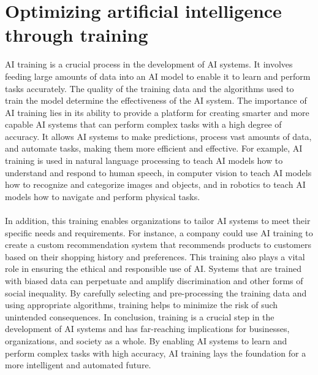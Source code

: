 \section{Optimizing artificial intelligence through training}
AI training is a crucial process in the development of AI systems. 
It involves feeding large amounts of data into an AI model to enable it to learn and perform 
tasks accurately. The quality of the training data and the algorithms used to train the model 
determine the effectiveness of the AI system.
The importance of AI training lies in its ability to provide a platform for creating smarter 
and more capable AI systems that can perform complex tasks with a high degree of accuracy. 
It allows AI systems to make predictions, process vast amounts of data, and automate tasks, 
making them more efficient and effective.
For example, AI training is used in natural language processing to teach AI models how to 
understand and respond to human speech, in computer vision to teach AI models how to recognize 
and categorize images and objects, and in robotics to teach AI models how to navigate and perform 
physical tasks. \cite{training}
\\
\\
In addition, this training enables organizations to tailor AI systems to meet their 
specific needs and requirements. For instance, a company could use AI training to 
create a custom recommendation system that recommends products to customers based 
on their shopping history and preferences.
This training also plays a vital role in ensuring the ethical and responsible use of AI. 
Systems that are trained with biased data can perpetuate and amplify discrimination 
and other forms of social inequality. By carefully selecting and pre-processing the 
training data and using appropriate algorithms, training helps to minimize the risk 
of such unintended consequences.
In conclusion, training is a crucial step in the development of AI systems and has 
far-reaching implications for businesses, organizations, and society as a whole. 
By enabling AI systems to learn and perform complex tasks with high accuracy, 
AI training lays the foundation for a more intelligent and automated future.
\\
\\
